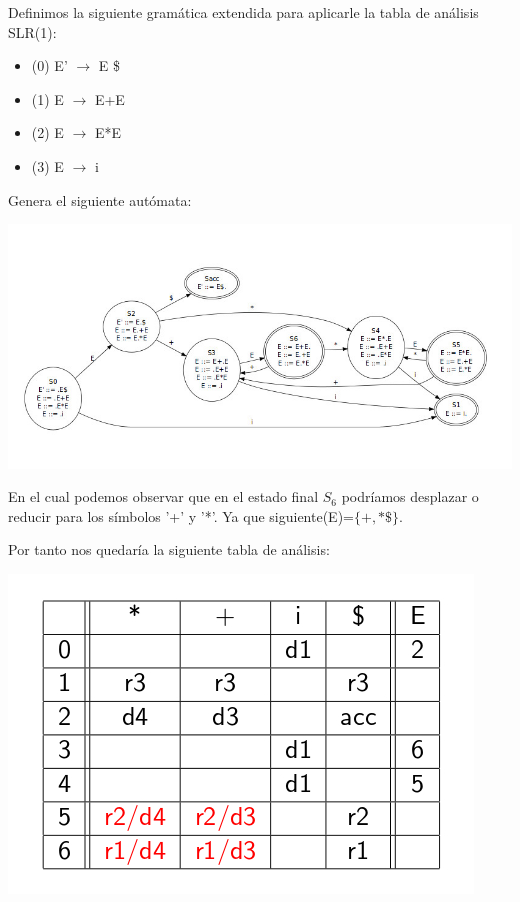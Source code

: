 \documentclass{apuntes}
\begin{document}
\begin{example}
Definimos la siguiente gramática extendida para aplicarle la tabla de análisis SLR(1):

\begin{itemize}
\item (0) E' $\rightarrow$ E \$
\item (1) E $\rightarrow$ E+E
\item (2) E $\rightarrow$ E*E
\item (3) E $\rightarrow$ i
\end{itemize}

Genera el siguiente autómata:
\begin{center}
\includegraphics[scale=0.5]{img/automataslr1conflicto.jpg}
\end{center}

En el cual podemos observar que en el estado final $S_6$ podríamos desplazar o reducir para los símbolos '+' y '*'. Ya que siguiente(E)=$\{+,*\$\}$.

Por tanto nos quedaría la siguiente tabla de análisis:

\begin{center}
\includegraphics[scale=0.4]{img/tablaanalisisslr1conflicto.jpg}
\end{center}
\end{example}
\end{document}
